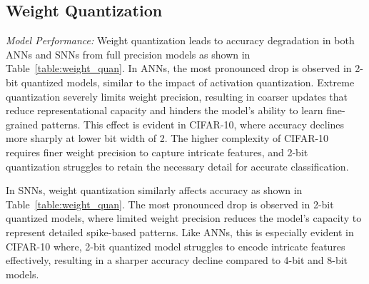

\subsection{Weight Quantization}
\noindent

\noindent
\textit{Model Performance:} Weight quantization leads to accuracy degradation in both ANNs and SNNs  from full precision models  as shown in Table~\ref{table:weight_quan}. In ANNs, the most pronounced drop is observed in 2-bit quantized models, similar to the impact of activation quantization. Extreme quantization severely limits weight precision, resulting in coarser updates that reduce representational capacity and hinders the model’s ability to learn fine-grained patterns. This effect is evident in CIFAR-10, where accuracy declines more sharply at lower bit width of 2. The higher complexity of CIFAR-10 requires finer weight precision to capture intricate features, and 2-bit quantization struggles to retain the necessary detail for accurate classification. 

In SNNs, weight quantization similarly affects accuracy  as shown in Table~\ref{table:weight_quan}. The most pronounced drop is observed in 2-bit quantized models, where  limited weight precision reduces the model's capacity to represent detailed spike-based patterns. Like ANNs, this is especially evident in CIFAR-10 where, 2-bit quantized model struggles to encode intricate features effectively, resulting in a sharper accuracy decline compared to 4-bit and 8-bit models.

